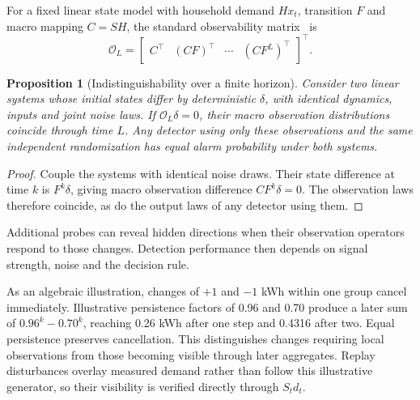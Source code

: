 \documentclass[conference]{IEEEtran}
\newtheorem{proposition}{Proposition}
\begin{document}
For a fixed linear state model with household demand $Hx_t$, transition $F$ and macro mapping $C=SH$, the standard observability matrix~\cite{hespanha} is
\begin{equation}
\mathcal O_L=\begin{bmatrix}C^\top&(CF)^\top&\cdots&(CF^L)^\top\end{bmatrix}^{\!\top}.
\end{equation}
\begin{proposition}[Indistinguishability over a finite horizon]
Consider two linear systems whose initial states differ by deterministic $\delta$, with identical dynamics, inputs and joint noise laws. If $\mathcal O_L\delta=0$, their macro observation distributions coincide through time $L$. Any detector using only these observations and the same independent randomization has equal alarm probability under both systems.
\end{proposition}
\begin{proof}
Couple the systems with identical noise draws. Their state difference at time $k$ is $F^k\delta$, giving macro observation difference $CF^k\delta=0$. The observation laws therefore coincide, as do the output laws of any detector using them.
\end{proof}

Additional probes can reveal hidden directions when their observation operators respond to those changes. Detection performance then depends on signal strength, noise and the decision rule.

As an algebraic illustration, changes of $+1$ and $-1$ kWh within one group cancel immediately. Illustrative persistence factors of 0.96 and 0.70 produce a later sum of $0.96^k-0.70^k$, reaching 0.26 kWh after one step and 0.4316 after two. Equal persistence preserves cancellation. This distinguishes changes requiring local observations from those becoming visible through later aggregates. Replay disturbances overlay measured demand rather than follow this illustrative generator, so their visibility is verified directly through $S_t d_t$.
\end{document}
